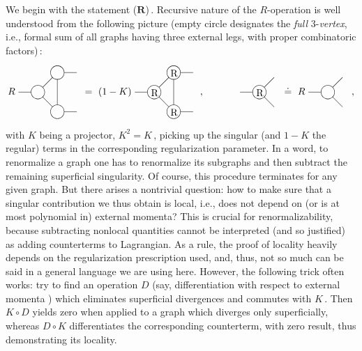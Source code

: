 \documentclass[a4paper,12pt]{article}
\begin{document}
We begin with the statement ($\mathbf R$)\,. Recursive nature of the
$R$-operation is well understood from the following picture
(empty circle designates the \emph{full} 3-\emph{vertex}, i.e., formal sum
of all graphs having three external legs,
with proper combinatoric factors)\,:
\begin{equation}
\label{R}
R \
\parbox{2.3cm}{
\begin{picture}(60,60)
\put(20,30){\circle{14}}
\put(40,10){\circle{14}}
\put(40,50){\circle{14}}
\put(0,30){\line(1,0){13}}
\put(47,50){\line(1,0){13}}
\put(47,10){\line(1,0){13}}
\put(25,35){\line(1,1){10}}
\put(25,25){\line(1,-1){10}}
\put(40,17){\line(0,1){26.5}}
\end{picture}
} = \ (1-K) \
\parbox{2.3cm}{
\begin{picture}(60,60)
\put(20,30){\circle{14}}
\put(40,10){\circle{14}}
\put(40,50){\circle{14}}
\put(0,30){\line(1,0){13}}
\put(47,50){\line(1,0){13}}
\put(47,10){\line(1,0){13}}
\put(25,35){\line(1,1){10}}
\put(25,25){\line(1,-1){10}}
\put(40,17){\line(0,1){26.5}}
\put(16.7,26){R}
\put(36.7,6){R}
\put(36.7,46){R}
\end{picture}
}\,, \ \ \ \ \ \ \ \ \ \ \
\parbox{1.5cm}{
\begin{picture}(35,60)
\put(20,30){\circle{14}}
\put(0,30){\line(1,0){13}}
\put(25,35){\line(1,1){10}}
\put(25,25){\line(1,-1){10}}
\put(16.7,26){R}
\end{picture}
} \doteq \ R\
\parbox{1.5cm}{
\begin{picture}(35,60)
\put(20,30){\circle{14}}
\put(0,30){\line(1,0){13}}
\put(25,35){\line(1,1){10}}
\put(25,25){\line(1,-1){10}}
\end{picture}
}\,,
\end{equation}
with $K$ being a projector, $K^2=K$\,, picking up the singular
(and $1\!-\!K$ the regular) terms in the corresponding regularization
parameter. In a word, to renormalize a graph one has to renormalize its
subgraphs and then subtract the remaining superficial singularity.
Of course, this procedure terminates for any given graph. But there arises a
nontrivial question: how to make sure that a singular contribution we thus
obtain is local, i.e., does not depend on (or is at most polynomial in)
external momenta? This is crucial for renormalizability, because subtracting
nonlocal quantities cannot be interpreted (and so justified) as adding
counterterms to Lagrangian. As a rule, the proof of locality heavily depends
on the regularization prescription used, and, thus, not so much
can be said in a general language we are using here. However, the following
trick often works: try to find an operation $D$ (say, differentiation
with respect to external momenta \cite{Co}) which eliminates
superficial divergences and commutes with $K$\,. Then $K\!\circ D$
yields zero when applied to a graph which diverges only superficially,
whereas $D\circ K$ differentiates the corresponding counterterm, with zero
result, thus demonstrating its locality.
\end{document}
